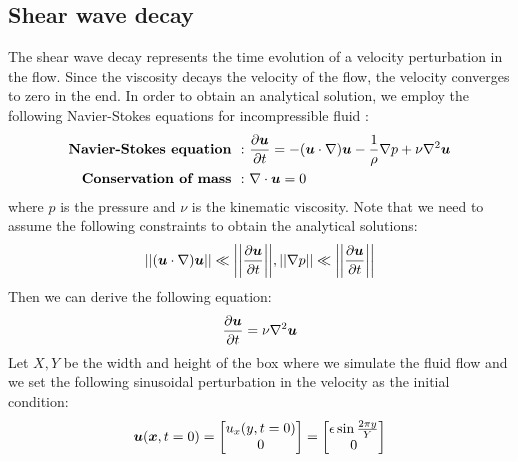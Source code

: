 \subsection{Shear wave decay}
The shear wave decay represents the time evolution of a
velocity perturbation in the flow.
Since the viscosity decays the velocity of the flow,
the velocity converges to zero in the end.
In order to obtain an analytical solution,
we employ the following Navier-Stokes equations for incompressible fluid
\cite{}:
\begin{equation}
  \begin{aligned}
    \text{\bf
      Navier-Stokes equation
    }:&~ \frac{\partial \boldsymbol{u}}{\partial t} = - (\boldsymbol{u} \cdot \nabla)\boldsymbol{u}
    - \frac{1}{\rho} \nabla p
    + \nu \nabla^2 \boldsymbol{u}\\
    \text{\bf
      Conservation of mass
    }: &~
    \nabla \cdot \boldsymbol{u} = 0
  \end{aligned}
\end{equation}
where $p$ is the pressure and $\nu$ is 
the kinematic viscosity.
Note that we need to assume the following
constraints to obtain the analytical solutions:
\begin{equation}
\begin{aligned}
 || (\boldsymbol{u} \cdot \nabla)\boldsymbol{u} || \ll \biggl|\biggl| \frac{\partial \boldsymbol{u}}{\partial t} \biggr|\biggr|,
  || \nabla p || \ll \biggl|\biggl| \frac{\partial \boldsymbol{u}}{\partial t} \biggr|\biggr|
\end{aligned}
\end{equation}
Then we can derive the following equation:
\begin{equation}
\begin{aligned}
  \frac{\partial \boldsymbol{u}}{\partial t} = \nu \nabla^2 \boldsymbol{u}
\end{aligned}
\label{relaxed-ns-eq}
\end{equation}
Let $X, Y$ be the width and height of the box
where we simulate the fluid flow
and we set the following sinusoidal perturbation
in the velocity as the initial condition:
\begin{equation}
\begin{aligned}
  \boldsymbol{u}(\boldsymbol{x}, t = 0) =
  \begin{bmatrix}
    u_x(y, t = 0) \\
    0 \\
  \end{bmatrix}
  =  
  \begin{bmatrix}
    \epsilon \sin \frac{2\pi y}{Y} \\
      0 \\
    \end{bmatrix}
\end{aligned}
\label{shear-vel-init}
\end{equation}
